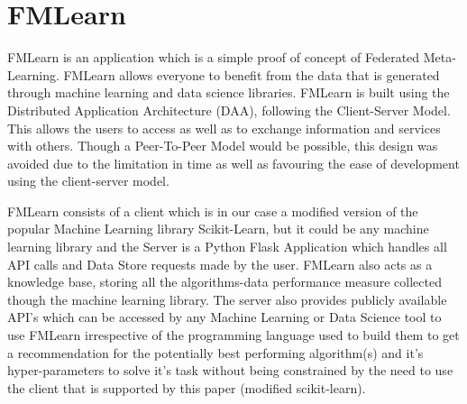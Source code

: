 \section{FMLearn}
\label{fmlearn}
FMLearn is an application which is a simple proof of concept of Federated Meta-Learning. FMLearn allows everyone to benefit from the data that is generated through machine learning and data science libraries. FMLearn is built using the Distributed Application Architecture (DAA), following the Client-Server Model. This allows the users to access as well as to exchange information and services with others. Though a Peer-To-Peer Model would be possible, this design was avoided due to the limitation in time as well as favouring the ease of development using the client-server model.

FMLearn consists of a client which is in our case a modified version of the popular Machine Learning library Scikit-Learn, but it could be any machine learning library and the Server is a Python Flask Application which handles all API calls and Data Store requests made by the user. FMLearn also acts as a knowledge base, storing all the algorithms-data performance measure collected though the machine learning library. The server also provides publicly available API's which can be accessed by any Machine Learning or Data Science tool to use FMLearn irrespective of the programming language used to build them to get a recommendation for the potentially best performing algorithm(s) and it’s hyper-parameters to solve it’s task without being constrained by the need to use the client that is supported by this paper (modified scikit-learn).

